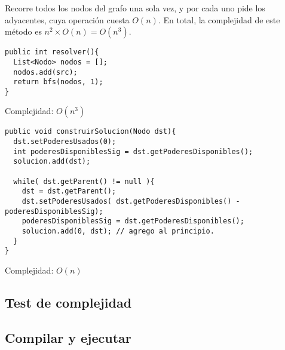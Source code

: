 Recorre todos los nodos del grafo una sola vez, y por cada uno pide los adyacentes, cuya operaci\'on cuesta $O(n)$. En total, la complejidad de este m\'etodo es $n^2 \times O(n) = O(n^3)$.  

\begin{verbatim}
public int resolver(){
  List<Nodo> nodos = [];
  nodos.add(src);
  return bfs(nodos, 1);
}
\end{verbatim}

Complejidad: $O(n^3)$

\begin{verbatim}
public void construirSolucion(Nodo dst){
  dst.setPoderesUsados(0);
  int poderesDisponiblesSig = dst.getPoderesDisponibles();
  solucion.add(dst);

  while( dst.getParent() != null ){
    dst = dst.getParent();
    dst.setPoderesUsados( dst.getPoderesDisponibles() - poderesDisponiblesSig);
    poderesDisponiblesSig = dst.getPoderesDisponibles();
    solucion.add(0, dst); // agrego al principio. 
  }
}
\end{verbatim}

Complejidad: $O(n)$

\subsection{Test de complejidad}

\subsection{Compilar y ejecutar}
